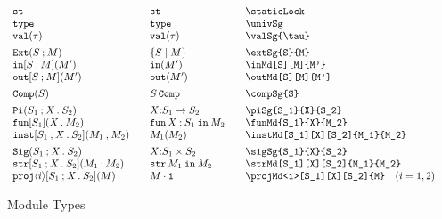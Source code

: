 \documentclass[11pt]{article}
\begin{document}
\begin{figure}

  \begin{small}
    \begin{displaymath}
      \begin{array}{l@{\qquad}l@{\qquad}l@{\qquad}l}
        \staticLock                    & \staticLock*         & \verb|\staticLock|                              \\
        \univSg                        & \univSg*             & \verb|\univSg|                                  \\
        \valSg{\tau}                   & \valSg*{\tau}        & \verb|\valSg{\tau}|                             \\[1ex]
        \extSg{S}{M}                   & \extSg*{S}{M}        & \verb|\extSg{S}{M}|                             \\
        \inMd[S][M]{M'}                & \inMd*{M'}           & \verb|\inMd[S][M]{M'}|                          \\
        \outMd[S][M]{M'}               & \outMd*{M'}          & \verb|\outMd[S][M]{M'}|                         \\[1ex]
        \compSg{S}                     & \compSg*{S}          & \verb|\compSg{S}|                               \\[1ex]
        \piSg{S_1}{X}{S_2}             & \piSg*{S_1}{X}{S_2}  & \verb|\piSg{S_1}{X}{S_2}|                       \\
        \funMd{S_1}{X}{M_2}            & \funMd*{S_1}{X}{M_2} & \verb|\funMd{S_1}{X}{M_2}|                      \\
        \instMd[S_1][X][S_2]{M_1}{M_2} & \instMd*{M_1}{M_2}   & \verb|\instMd[S_1][X][S_2]{M_1}{M_2}|           \\[1ex]
        \sigSg{S_1}{X}{S_2}            & \sigSg*{S_1}{X}{S_2} & \verb|\sigSg{S_1}{X}{S_2}|                      \\
        \strMd[S_1][X][S_2]{M_1}{M_2}  & \strMd*{M_1}{M_2}    & \verb|\strMd[S_1][X][S_2]{M_1}{M_2}|            \\
        \projMd<i>[S_1][X][S_2]{M}     & \projMd*<i>{M}       & \verb|\projMd<i>[S_1][X][S_2]{M}| \quad (i=1,2)
      \end{array}
    \end{displaymath}
  \end{small}

  \caption{Module Types}
  \label{fig:mod}
\end{figure}
\end{document}

